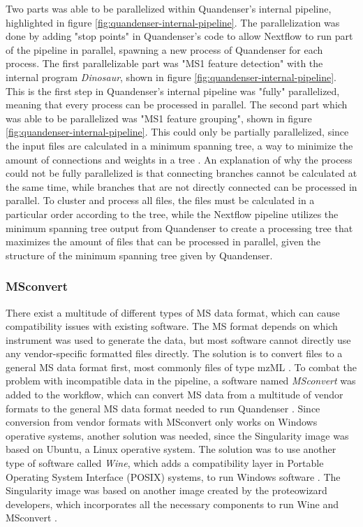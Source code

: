 Two parts was able to be parallelized within Quandenser's internal pipeline, highlighted in figure \ref{fig:quandenser-internal-pipeline}. The parallelization was done by adding "stop points" in Quandenser's code to allow Nextflow to run part of the pipeline in parallel, spawning a new process of Quandenser for each process. The first parallelizable part was "MS1 feature detection" with the internal program \textit{Dinosaur}, shown in figure \ref{fig:quandenser-internal-pipeline}. This is the first step in Quandenser's internal pipeline was "fully" parallelized, meaning that every process can be processed in parallel. The second part which was able to be parallelized was "MS1 feature grouping", shown in figure \ref{fig:quandenser-internal-pipeline}. This could only be partially parallelized, since the input files are calculated in a minimum spanning tree, a way to minimize the amount of connections and weights in a tree \cite{min-span-tree}. An explanation of why the process could not be fully parallelized is that connecting branches cannot be calculated at the same time, while branches that are not directly connected can be processed in parallel. To cluster and process all files, the files must be calculated in a particular order according to the tree, while the Nextflow pipeline utilizes the minimum spanning tree output from Quandenser to create a processing tree that maximizes the amount of files that can be processed in parallel, given the structure of the minimum spanning tree given by Quandenser.

\subsubsection{MSconvert}
There exist a multitude of different types of MS data format, which can cause compatibility issues with existing software. The MS format depends on which instrument was used to generate the data, but most software cannot directly use any vendor-specific formatted files directly. The solution is to convert files to a general MS data format first, most commonly files of type mzML \cite{mzml-format}. To combat the problem with incompatible data in the pipeline, a software named \textit{MSconvert} was added to the workflow, which can convert MS data from a multitude of vendor formats to the general MS data format needed to run Quandenser \cite{proteowizard}. Since conversion from vendor formats with MSconvert only works on Windows operative systems, another solution was needed, since the Singularity image was based on Ubuntu, a Linux operative system. The solution was to use another type of software called \textit{Wine}, which adds a compatibility layer in Portable Operating System Interface (POSIX) systems, to run Windows software \cite{wine}. The Singularity image was based on another image created by the proteowizard developers, which incorporates all the necessary components to run Wine and MSconvert \cite{docker-image, docker-howto}.

